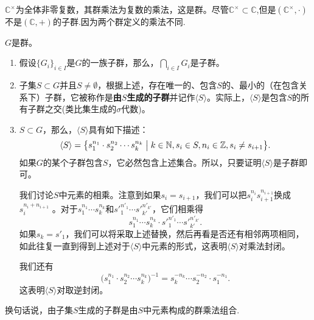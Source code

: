 \documentclass[lang=cn,10pt]{elegantbook}
\begin{document}
	\begin{example}
		\(\mathbb{C}^\times\)为全体非零复数，其群乘法为复数的乘法，这是群。尽管\(\mathbb{C}^\times \subset \mathbb{C}\),但是\((\mathbb{C}^\times,\cdot)\)不是\((\mathbb{C},+)\)的子群.因为两个群定义的乘法不同.
	\end{example}
	\begin{proposition}[由子集生成的子群]
		$G$是群。
	\begin{enumerate}
		\item  假设$\{G_i\}_{i\in I}$是$G$的一族子群，那么，$\displaystyle\bigcap_{i\in I}G_i$是子群。
		
		\item 子集$S\subset G$并且$S\neq \emptyset$，根据上述，存在唯一的、包含$S$的、最小的（在包含关系下）子群，它被称作是{\bf 由$S$生成的子群}并记作$\langle S \rangle$。实际上，$\langle S \rangle$是包含$S$的所有子群之交(类比集生成的\(\sigma\)代数)。
		
		\item $S\subset G$，那么，$\langle S\rangle$具有如下描述：
		\[\langle S \rangle=\big\{s_1^{n_1}\cdot s_2^{n_2} \cdots s_{k}^{n_{k}}\bigm|k\in \mathbb{N}, s_i\in S, n_i\in \mathbb{Z}, s_i\neq s_{i+1}\big\}.\]
		如果$G$的某个子群包含$S$，它必然包含上述集合。所以，只要证明$\langle S \rangle$是子群即可。
		
		我们讨论$S$中元素的相乘。注意到如果$s_i=s_{i+1}$，我们可以把$s_i^{n_i}s_{i+1}^{n_{i+1}}$换成$s_i^{n_i+n_{i+1}}$ 。对于$s_1^{n_1} \cdots  s_{k}^{n_k}$和${s'}_1^{n'_1}\cdots {s'}_{k'}^{n'_{k'}}$，它们相乘得
		\[s_1^{n_1} \cdots  s_{k}^{n_{k}} \cdot {s'}_1^{n'_1}\cdots {s'}_{k'}^{n'_{k'}}.\]
		如果$s_{k} ={s'}_1$，我们可以将采取上述替换，然后再看是否还有相邻两项相同，如此往复一直到得到上述对于$\langle S\rangle$中元素的形式，这表明$\langle S\rangle$对乘法封闭。
		
		我们还有
		\[\big(s_1^{n_1}\cdot s_2^{n_2} \cdots s_{k}^{n_{k}}\big)^{-1}=s_{k}^{-n_{k}}\cdots s_2^{-n_2} \cdot s_1^{-n_1}. \]
		这表明$\langle S\rangle$对取逆封闭。
	\end{enumerate}
	换句话说，由子集\(S\)生成的子群是由\(S\)中元素构成的群乘法组合.
	\end{proposition}
	
\end{document}
